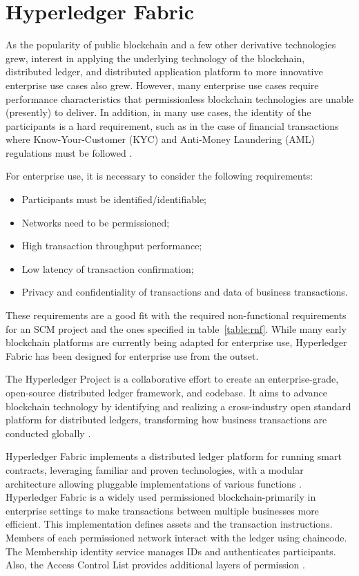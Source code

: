 \section{Hyperledger Fabric}\label{sec:hyperledger}

As the popularity of public blockchain and a few other derivative technologies grew, interest in applying the underlying technology of the blockchain, distributed ledger, and distributed application platform to more innovative enterprise use cases also grew. However, many enterprise use cases require performance characteristics that permissionless blockchain technologies are unable (presently) to deliver. In addition, in many use cases, the identity of the participants is a hard requirement, such as in the case of financial transactions where Know-Your-Customer (KYC) and Anti-Money Laundering (AML) regulations must be followed \cite{POLGE2020}.

For enterprise use, it is necessary to consider the following requirements:

\begin{itemize}
\item Participants must be identified/identifiable;
\item Networks need to be permissioned;
\item High transaction throughput performance;
\item Low latency of transaction confirmation;
\item Privacy and confidentiality of transactions and data of business transactions.
\end{itemize}

These requirements are a good fit with the required non-functional requirements for an SCM project and the ones specified in table~\ref{table:rnf}. While many early blockchain platforms are currently being adapted for enterprise use, Hyperledger Fabric has been designed for enterprise use from the outset. 

The Hyperledger Project is a collaborative effort to create an enterprise-grade, open-source distributed ledger framework, and codebase. It aims to advance blockchain technology by identifying and realizing a cross-industry open standard platform for distributed ledgers, transforming how business transactions are conducted globally \cite{cachin2016architecture}.

Hyperledger Fabric implements a distributed ledger platform for running smart contracts, leveraging familiar and proven technologies, with a modular architecture allowing pluggable implementations of various functions \cite{cachin2016architecture}. Hyperledger Fabric is a widely used permissioned blockchain-primarily in enterprise settings to make transactions between multiple businesses more efficient. This implementation defines assets and the transaction instructions. Members of each permissioned network interact with the ledger using chaincode. The Membership identity service manages IDs and authenticates participants. Also, the Access Control List provides additional layers of permission \cite{blockgeeks2018deeper}.

